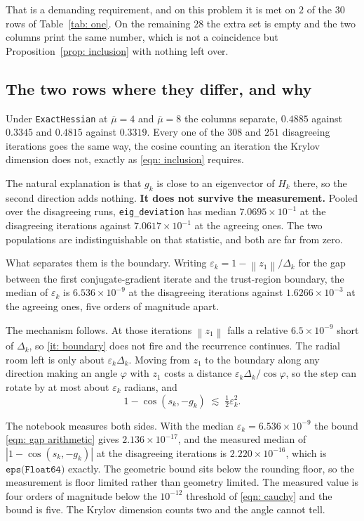 \documentclass[11pt,a4paper]{article}
\providecommand{\abs}[1]{\left \vert #1 \right \vert}
\providecommand{\norm}[1]{\left \lVert #1 \right \rVert}
\theoremstyle{remark}
\begin{document}
That is a demanding requirement, and on this problem it is met on $2$ of the $30$
rows of Table~\ref{tab: one}. On the remaining $28$ the extra set is empty and the
two columns print the same number, which is not a coincidence but
Proposition~\ref{prop: inclusion} with nothing left over.

\subsection{The two rows where they differ, and why}

Under \texttt{ExactHessian} at $\overline{\mu} = 4$ and $\overline{\mu} = 8$ the
columns separate, $0.4885$ against $0.3345$ and $0.4815$ against $0.3319$. Every
one of the $308$ and $251$ disagreeing iterations goes the same way, the cosine
counting an iteration the Krylov dimension does not, exactly as
\eqref{eqn: inclusion} requires.

The natural explanation is that $g_k$ is close to an eigenvector of $H_k$ there,
so the second direction adds nothing. \textbf{It does not survive the
measurement.} Pooled over the disagreeing runs, \texttt{eig\_deviation} has median
$7.0695 \times 10^{-1}$ at the disagreeing iterations against
$7.0617 \times 10^{-1}$ at the agreeing ones. The two populations are
indistinguishable on that statistic, and both are far from zero.

What separates them is the boundary. Writing
$\varepsilon_k = 1 - \norm{z_1}/\Delta_k$ for the gap between the first
conjugate-gradient iterate and the trust-region boundary, the median of
$\varepsilon_k$ is $6.536\times10^{-9}$ at the disagreeing iterations against
$1.6266\times10^{-3}$ at the agreeing ones, five orders of magnitude apart.

The mechanism follows. At those iterations $\norm{z_1}$ falls a relative
$6.5\times10^{-9}$ short of $\Delta_k$, so \ref{it: boundary} does not fire and
the recurrence continues. The radial room left is only about
$\varepsilon_k\Delta_k$. Moving from $z_1$ to the boundary along any direction
making an angle $\varphi$ with $z_1$ costs a distance $\varepsilon_k\Delta_k /
\cos\varphi$, so the step can rotate by at most about $\varepsilon_k$ radians,
and
\begin{equation}
  1 - \cos(s_k,-g_k) \;\lesssim\; \tfrac12\varepsilon_k^2 .
  \label{eqn: gap arithmetic}
\end{equation}

The notebook measures both sides. With the median $\varepsilon_k =
6.536\times10^{-9}$ the bound \eqref{eqn: gap arithmetic} gives
$2.136\times10^{-17}$, and the measured median of $\abs{1 - \cos(s_k,-g_k)}$ at
the disagreeing iterations is $2.220\times10^{-16}$, which is
$\texttt{eps(Float64)}$ exactly. The geometric bound sits below the rounding
floor, so the measurement is floor limited rather than geometry limited. The
measured value is four orders of magnitude below the $10^{-12}$ threshold of
\eqref{eqn: cauchy} and the bound is five. The Krylov dimension counts two and
the angle cannot tell.
\end{document}
